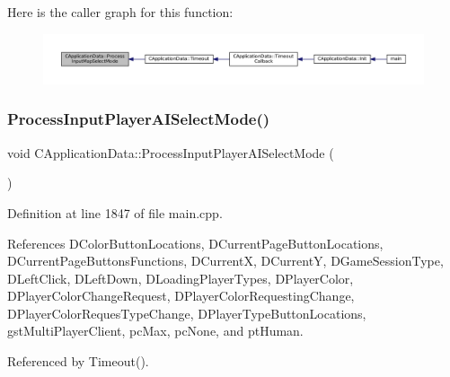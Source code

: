 Here is the caller graph for this function\+:\nopagebreak
\begin{figure}[H]
\begin{center}
\leavevmode
\includegraphics[width=350pt]{classCApplicationData_a4fb3ad6900161476b5dace2d7cf9908c_icgraph}
\end{center}
\end{figure}
\hypertarget{classCApplicationData_a096afda0b6459cfa73d66518ce23f68e}{}\label{classCApplicationData_a096afda0b6459cfa73d66518ce23f68e} 
\subsubsection{\texorpdfstring{Process\+Input\+Player\+A\+I\+Select\+Mode()}{ProcessInputPlayerAISelectMode()}}
{\footnotesize\ttfamily void C\+Application\+Data\+::\+Process\+Input\+Player\+A\+I\+Select\+Mode (\begin{DoxyParamCaption}{ }\end{DoxyParamCaption})\hspace{0.3cm}{\ttfamily [protected]}}



Definition at line 1847 of file main.\+cpp.



References D\+Color\+Button\+Locations, D\+Current\+Page\+Button\+Locations, D\+Current\+Page\+Buttons\+Functions, D\+CurrentX, D\+CurrentY, D\+Game\+Session\+Type, D\+Left\+Click, D\+Left\+Down, D\+Loading\+Player\+Types, D\+Player\+Color, D\+Player\+Color\+Change\+Request, D\+Player\+Color\+Requesting\+Change, D\+Player\+Color\+Reques\+Type\+Change, D\+Player\+Type\+Button\+Locations, gst\+Multi\+Player\+Client, pc\+Max, pc\+None, and pt\+Human.



Referenced by Timeout().


